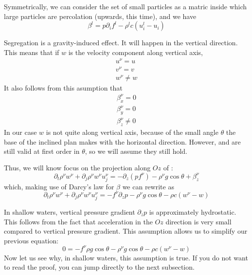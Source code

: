 \documentclass[11pt]{book}
\begin{document}
Symmetrically, we can consider the set of small particles as a matric inside which large particles are percolation (upwards, this time), and we have
\begin{equation}
\beta^l = p \partial_i f^l - \rho^l c (u^l_i - u_i)
\end{equation}

Segregation is a gravity-induced effect. It will happen in the vertical direction. This means that if $w$ is the velocity component along vertical axis,
\begin{align} \label{eq:vel_asump}
u^\nu = u \\
v^\nu = v \\
w^\nu \neq w
\end{align}
It also follows from this asumption that 
\begin{align} \label{eq:forces_asump}
\beta^\nu_x = 0 \\
\beta^\nu_y = 0 \\
\beta^\nu_z \neq 0
\end{align}
In our case $w$ is not quite along vertical axis, because of the small angle $\theta$ the base of the inclined plan makes with the horizontal direction. 
However, \cite{eq:vel_asump} and \cite{eq:forces_sump} are still valid at first order in $\theta$, so we will assume they still hold.

Thus, we will know focus on the projection along $Oz$ of \cite{eq:mom_bal}:
\begin{equation} \label{eq:z_proj}
	\partial_t \rho^\nu w^\nu + \partial_j \rho^\nu w^\nu u_j^\nu = -\partial_z \left( p f^\nu \right) - \rho^\nu g \cos \theta + \beta^\nu_z 
\end{equation}
which, making use of Darcy's law for $\beta$ we can rewrite as
\begin{equation} 
	\partial_t \rho^\nu w^\nu + \partial_j \rho^\nu w^\nu u_j^\nu = -f^\nu \partial_z p  - \rho^\nu g \cos \theta - \rho c (w^\nu - w)
\end{equation}

In shallow waters, vertical pressure gradient $ \partial_z p $ is approximately hydrostatic. This follows from the fact that acceleration in the $Oz$ direction is very small compared to vertical pressure gradient. 
This assumption allows us to simplify our previous equation:
\begin{equation} \label{eq:z_proj}
	0 = -f^\nu \rho g \cos \theta - \rho^\nu g \cos \theta - \rho c (w^\nu - w)
\end{equation}
Now let us see why, in shallow waters, this assumption is true. If you do not want to read the proof, you can jump directly to the next subsection.
\end{document}
